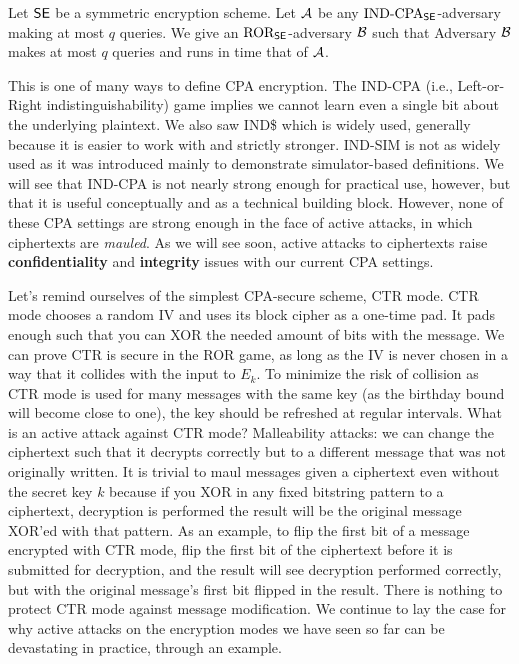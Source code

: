 \begin{theorem}
Let ${\mathsf{SE}}$ be a symmetric encryption scheme. Let ${\mathcal A}$ be any
$\textnormal{IND-CPA}_{\mathsf{SE}}$-adversary making at most $q$ queries. 
We give an $\textnormal{ROR}_{\mathsf{SE}}$-adversary ${\mathcal B}$ such that
\bnm
  \AdvINDCPA{\SE}{\advA} \cdotsm\AdvROR{\SE}{\advB}
\enm
Adversary ${\mathcal B}$ makes at most $q$ 
queries and runs in time that of ${\mathcal A}$.
\label{theorem:ror-cpa}
\end{theorem}

This is one of many ways to define CPA encryption.
The IND-CPA (i.e., Left-or-Right indistinguishability) game implies we cannot learn even a single bit about the underlying plaintext. We also saw IND\$ which is widely used, generally because it is easier to work with and strictly stronger. IND-SIM is not as widely used as it was introduced mainly to demonstrate simulator-based definitions. We will see that IND-CPA is not nearly strong enough for practical use, however, but that it is useful conceptually and as a technical building block. However, none of these CPA settings are strong enough in the face of active attacks, in which ciphertexts are \emph{mauled}. As we will see soon, active attacks to ciphertexts raise {\bf confidentiality} and {\bf integrity} issues with our current CPA settings.

Let's remind ourselves of the simplest CPA-secure scheme, CTR mode. 
CTR mode chooses a random IV and uses its block cipher as a one-time pad. It pads enough such that you can XOR the needed amount of bits with the message. We can prove CTR is secure in the ROR game, as long as the IV is never chosen in a way that it collides with the input to $E_k$. To minimize the risk of collision as CTR mode is used for many messages with the same key (as the birthday bound will become close to one), the key should be refreshed at regular intervals.
What is an active attack against CTR mode? Malleability attacks: we can change the ciphertext such that it decrypts correctly but to a different message that was not originally written. It is trivial to maul messages given a ciphertext even without the secret key $k$ because if you XOR in any fixed bitstring pattern to a ciphertext, decryption is performed the result will be the original message XOR'ed with that pattern. As an example, to flip the first bit of a message encrypted with CTR mode, flip the first bit of the ciphertext before it is submitted for decryption, and the result will see decryption performed correctly, but with the original message's first bit flipped in the result. There is nothing to protect CTR mode against message modification. We continue to lay the case for why active attacks on the encryption modes we have seen so far can be devastating in practice, through an example.

